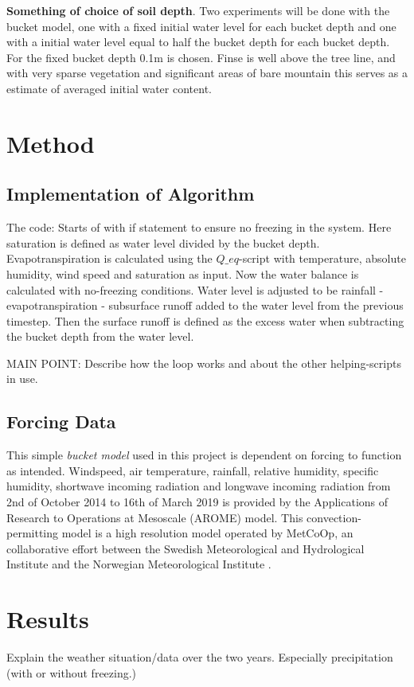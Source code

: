 \documentclass[a4paper,11pt,twocolumn]{article}
\begin{document}
\textbf{Something of choice of soil depth}. 
Two experiments will be done with the bucket model, one with a fixed initial water level for each bucket depth and one with a initial water level equal to half the bucket depth for each bucket depth. For the fixed bucket depth 0.1m is chosen. Finse is well above the tree line, and with very sparse vegetation and significant areas of bare mountain this serves as a estimate of averaged initial water content.     

\section{Method}
\subsection{Implementation of Algorithm}
The code: Starts of with if statement to ensure no freezing in the system. Here saturation is defined as water level divided by the bucket depth. Evapotranspiration is calculated using the $Q\_eq$-script with temperature, absolute humidity, wind speed and saturation as input. Now the water balance is calculated with no-freezing conditions. Water level is adjusted to be rainfall - evapotranspiration - subsurface runoff added to the water level from the previous timestep. Then the surface runoff is defined as the excess water when subtracting the bucket depth from the water level. 


MAIN POINT: Describe how the loop works and about the other helping-scripts in use. 

\subsection{Forcing Data}

This simple \textit{bucket model} used in this project is dependent on forcing to function as intended. Windspeed, air temperature, rainfall, relative humidity, specific humidity, shortwave incoming radiation and longwave incoming radiation from 2nd of October 2014 to 16th of March 2019 is provided by the Applications of Research to Operations at Mesoscale (AROME) model. This convection-permitting model is a high resolution model operated by MetCoOp, an collaborative effort between the Swedish Meteorological and Hydrological Institute and the Norwegian Meteorological Institute \cite{muller}. 


\section{Results}
Explain the weather situation/data over the two years. Especially precipitation (with or without freezing.)
\end{document}
